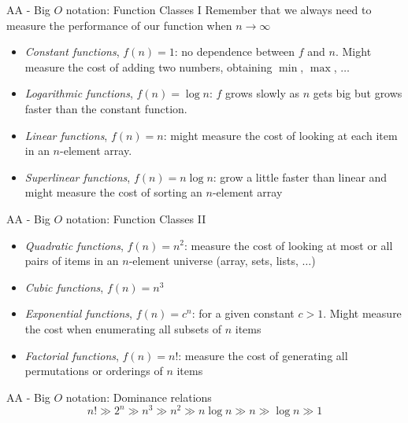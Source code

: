 \documentclass{beamer}
\begin{document}
\begin{frame}{AA - Big $O$ notation: Function Classes I}
    Remember that we always need to measure the performance of our function when $n \to \infty$
    \begin{itemize}
        \item \textit{Constant functions}, $f(n) = 1$: no dependence between $f$ and $n$. Might measure the cost of adding two numbers, obtaining $\min$, $\max$, $\dots$
        \item \textit{Logarithmic functions}, $f(n) = \log n$: $f$ grows slowly as $n$ gets big but grows faster than the constant function. 
        \item \textit{Linear functions}, $f(n) = n$: might measure the cost of looking at each item in an $n$-element array.
        \item \textit{Superlinear functions}, $f(n) = n\log n$: grow a little faster than linear and might measure the cost of sorting an $n$-element array
    \end{itemize}
\end{frame}

\begin{frame}{AA - Big $O$ notation: Function Classes II}
    \begin{itemize}
        \item \textit{Quadratic functions}, $f(n) = n^2$: measure the cost of looking at most or all pairs of items in an $n$-element universe (array, sets, lists, $\dots$)
        \item \textit{Cubic functions}, $f(n) = n^3$
        \item \textit{Exponential functions}, $f(n) = c^n$: for a given constant $c>1$. Might measure the cost when enumerating all subsets of $n$ items
        \item \textit{Factorial functions}, $f(n) = n!$: measure the cost of generating all permutations or orderings of $n$ items
    \end{itemize}
\end{frame}

\begin{frame}{AA - Big $O$ notation: Dominance relations}
    $$n! \gg 2^n \gg n^3 \gg n^2 \gg n\log n \gg n \gg \log n \gg 1$$
\end{frame}
\end{document}
